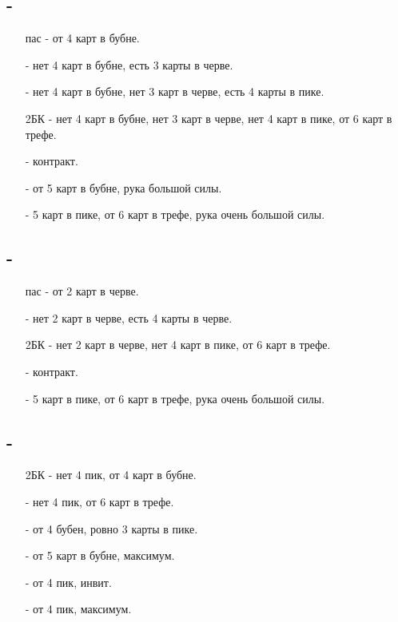 \documentclass{article}
\begin{document}
\subsection{ - }
\begin{enumerate}
    \item[пас] - от 4 карт в бубне.
    \item[\he{2}] - нет 4 карт в бубне, есть 3 карты в черве.
    \item[\sp{2}] - нет 4 карт в бубне, нет 3 карт в черве, есть 4 карты в пике.
    \item[2БК] - нет 4 карт в бубне, нет 3 карт в черве, нет 4 карт в пике, от 6 карт в трефе.
    \item[\cl{3}] - контракт.
    \item[\di{3}] - от 5 карт в бубне, рука большой силы.
    \item[\sp{3}] - 5 карт в пике, от 6 карт в трефе, рука очень большой силы.
\end{enumerate}
\subsection{ - }
\begin{enumerate}
    \item[пас] - от 2 карт в черве.
    \item[\sp{2}] - нет 2 карт в черве, есть 4 карты в черве.
    \item[2БК] - нет 2 карт в черве, нет 4 карт в пике, от 6 карт в трефе.
    \item[\cl{3}] - контракт.
    \item[\sp{3}] - 5 карт в пике, от 6 карт в трефе, рука очень большой силы.
\end{enumerate}
\subsection{ - }
\begin{enumerate}
    \item[2БК] - нет 4 пик, от 4 карт в бубне.
    \item[\cl{3}] - нет 4 пик, от 6 карт в трефе.
    \item[\di{3}] - от 4 бубен, ровно 3 карты в пике.
    \item[\he{3}] - от 5 карт в бубне, максимум.
    \item[\sp{3}] - от 4 пик, инвит.
    \item[\cl{4}] - от 4 пик, максимум.
\end{enumerate}
\end{document}
